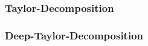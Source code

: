 \subsubsection{Taylor-Decomposition}
\blindtext[1]

\subsubsection{Deep-Taylor-Decomposition}
\blindtext[1]